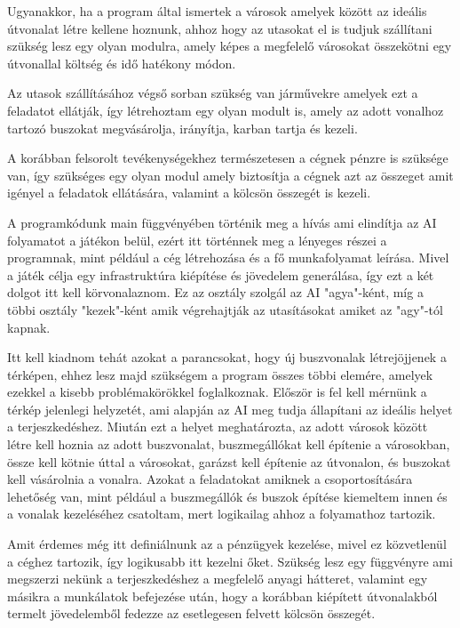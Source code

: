 Ugyanakkor, ha a program által ismertek a városok amelyek között az ideális útvonalat létre kellene hoznunk, ahhoz hogy az utasokat el is tudjuk szállítani szükség lesz egy olyan modulra, amely képes a megfelelő városokat összekötni egy útvonallal költség és idő hatékony módon.

Az utasok szállításához végső sorban szükség van járművekre amelyek ezt a feladatot ellátják, így létrehoztam egy olyan modult is, amely az adott vonalhoz tartozó buszokat megvásárolja, irányítja, karban tartja és kezeli.

A korábban felsorolt tevékenységekhez természetesen a cégnek pénzre is szüksége van, így szükséges egy olyan modul amely biztosítja a cégnek azt az összeget amit igényel a feladatok ellátására, valamint a kölcsön összegét is kezeli.



A programkódunk main függvényében történik meg a hívás ami elindítja az AI folyamatot a játékon belül, ezért itt történnek meg a lényeges részei a programnak, mint például a cég létrehozása és a fő munkafolyamat leírása. Mivel a játék célja egy infrastruktúra kiépítése és jövedelem generálása, így ezt a két dolgot itt kell körvonalaznom. Ez az osztály szolgál az AI "agya"-ként, míg a többi osztály "kezek"-ként amik végrehajtják az utasításokat amiket az "agy"-tól kapnak.

Itt kell kiadnom tehát azokat a parancsokat, hogy új buszvonalak létrejöjjenek a térképen, ehhez lesz majd szükségem a program összes többi elemére, amelyek ezekkel a kisebb problémakörökkel foglalkoznak. Először is fel kell mérnünk a térkép jelenlegi helyzetét, ami alapján az AI meg tudja állapítani az ideális helyet a terjeszkedéshez. Miután ezt a helyet meghatározta, az adott városok között létre kell hoznia az adott buszvonalat, buszmegállókat kell építenie a városokban, össze kell kötnie úttal a városokat, garázst kell építenie az útvonalon, és buszokat kell vásárolnia a vonalra. Azokat a feladatokat amiknek a csoportosítására lehetőség van, mint például a buszmegállók és buszok építése kiemeltem innen és a vonalak kezeléséhez csatoltam, mert logikailag ahhoz a folyamathoz tartozik.

Amit érdemes még itt definiálnunk az a pénzügyek kezelése, mivel ez közvetlenül a céghez tartozik, így logikusabb itt kezelni őket. Szükség lesz egy függvényre ami megszerzi nekünk a terjeszkedéshez a megfelelő anyagi hátteret, valamint egy másikra a munkálatok befejezése után, hogy a korábban kiépített útvonalakból termelt jövedelemből fedezze az esetlegesen felvett kölcsön összegét.

